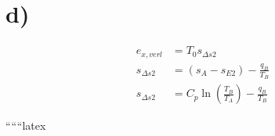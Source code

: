 

\section*{d)}

\begin{align*}
    e_{x,verl} &= T_0 s_{\Delta s2} \\
    s_{\Delta s2} &= (s_A - s_{E2}) - \frac{q_B}{T_B} \\
    s_{\Delta s2} &= C_p \ln \left( \frac{T_B}{T_A} \right) - \frac{q_B}{T_B}
\end{align*}

``````latex
